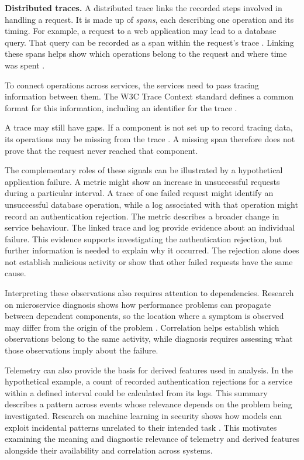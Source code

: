 \noindent\textbf{Distributed traces.} A distributed trace links the recorded
steps involved in handling a request. It is made up of \emph{spans}, each
describing one operation and its timing. For example, a request to a web
application may lead to a database query. That query can be recorded as a
span within the request's trace
\parencite{opentelemetry2026observability}. Linking these spans helps show
which operations belong to the request and where time was spent
\parencite{ashok2024traceweaver}.

To connect operations across services, the services need to pass tracing
information between them. The W3C Trace Context standard defines a common
format for this information, including an identifier for the trace
\parencite{w3c2021tracecontext}.

A trace may still have gaps. If a component is not set up to record tracing
data, its operations may be missing from the trace
\parencite{ashok2024traceweaver}. A missing span therefore does not prove
that the request never reached that component.

The complementary roles of these signals can be illustrated by a hypothetical
application failure. A metric might show an increase in unsuccessful
requests during a particular interval. A trace of one failed request might
identify an unsuccessful database operation, while a log associated with
that operation might record an authentication rejection. The metric
describes a broader change in service behaviour. The linked trace and log
provide evidence about an individual failure. This evidence supports
investigating the authentication rejection, but further information is
needed to explain why it occurred. The rejection alone does not establish
malicious activity or show that other failed requests have the same cause.

Interpreting these observations also requires attention to dependencies.
Research on microservice diagnosis shows how performance problems can
propagate between dependent components, so the location where a symptom is
observed may differ from the origin of the problem
\parencite{gan2021sage}. Correlation helps establish which observations
belong to the same activity, while diagnosis requires assessing what those
observations imply about the failure.

Telemetry can also provide the basis for derived features used in analysis.
In the hypothetical example, a count of recorded authentication rejections
for a service within a defined interval could be calculated from its logs.
This summary describes a pattern across events whose relevance depends on
the problem being investigated. Research on machine learning in security
shows how models can exploit incidental patterns unrelated to their
intended task \parencite{arp2022dosdonts}. This motivates examining the
meaning and diagnostic relevance of telemetry and derived features alongside
their availability and correlation across systems.


